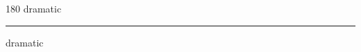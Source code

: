 
\begin{frame}
\begin{center}
\begin{turn}{180}
{\fontsize{2.5cm}{1em}\selectfont dramatic}
\end{turn}
\vspace{1em}\par  
\hrule
\vspace{1em}\par  
{\fontsize{2.5cm}{1em}\selectfont dramatic}
\end{center}
\end{frame}
